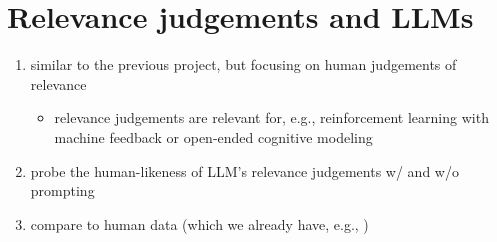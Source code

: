 \documentclass[fleqn,reqno,10pt]{article}
\begin{document}
\section{Relevance judgements and LLMs}

\begin{enumerate}
  \item similar to the previous project, but focusing on human judgements of relevance
  \begin{itemize}
    \item relevance judgements are relevant for, e.g., reinforcement learning with machine feedback or open-ended cognitive modeling
  \end{itemize}
  \item probe the human-likeness of LLM's relevance judgements w/ and w/o prompting
  \item compare to human data (which we already have, e.g., \citet{WarstadtAgha2022:Testing-Bayesia})
\end{enumerate}



\end{document}

